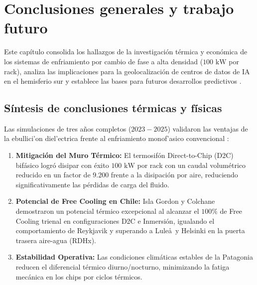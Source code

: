 \chapter{Conclusiones generales y trabajo futuro}
\label{chap:conclusiones}

Este cap\'itulo consolida los hallazgos de la investigaci\'on t\'ermica y econ\'omica de los sistemas de enfriamiento por cambio de fase a alta densidad ($100\text{ kW}$ por rack), analiza las implicaciones para la geolocalizaci\'on de centros de datos de IA en el hemisferio sur y establece las bases para futuros desarrollos predictivos \cite{masnet2020}.

\section{S\'intesis de conclusiones t\'ermicas y f\'isicas}
Las simulaciones de tres a\~nos completos ($2023-2025$) validaron las ventajas de la ebullici'on diel'ectrica frente al enfriamiento monof'asico convencional \cite{garrity2014}:
\begin{enumerate}
    \item \textbf{Mitigaci\'on del Muro T\'ermico:} El termosif\'on Direct-to-Chip (D2C) bif\'asico logr\'o disipar con \'exito $100\text{ kW}$ por rack con un caudal volum\'etrico reducido en un factor de $9.200$ frente a la disipaci\'on por aire, reduciendo significativamente las p\'erdidas de carga del fluido.
    \item \textbf{Potencial de Free Cooling en Chile:} Isla Gordon y Colchane demostraron un potencial t\'ermico excepcional al alcanzar el $100\%$ de Free Cooling trienal en configuraciones D2C e Inmersi\'on, igualando el comportamiento de Reykjavik y superando a Lule\aa\ y Helsinki en la puerta trasera aire-agua (RDHx).
    \item \textbf{Estabilidad Operativa:} Las condiciones clim\'aticas estables de la Patagonia reducen el diferencial t\'ermico diurno/nocturno, minimizando la fatiga mec\'anica en los chips por ciclos t\'ermicos.
\end{enumerate}


